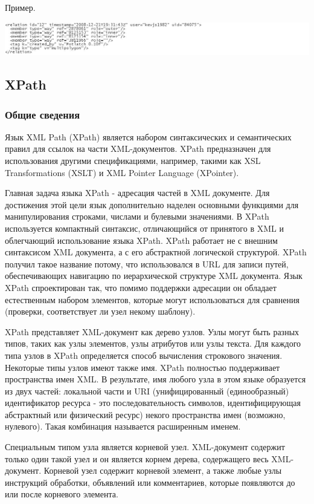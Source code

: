 \documentclass[12pt,a4paper,oneside]{article} %
\begin{document}
Пример.

\includegraphics[width=1.2\linewidth]{ref}

\newpage
\subsection{XPath}
\subsubsection{Общие сведения}
Язык XML Path (XPath) является набором синтаксических и семантических правил для ссылок на части XML-документов. XPath предназначен для использования другими спецификациями, например, такими как XSL Transformations (XSLT) и XML Pointer Language (XPointer).

Главная задача языка XPath - адресация частей в XML документе. Для достижения этой цели язык дополнительно наделен основными функциями для манипулирования строками, числами и булевыми значениями. В XPath используется компактный синтаксис, отличающийся от принятого в XML и облегчающий использование языка XPath. XPath работает не с внешним синтаксисом XML документа, а с его абстрактной логической структурой. XPath получил такое название потому, что использовался в URL для записи путей, обеспечивающих навигацию по иерархической структуре XML документа.
Язык XPath спроектирован так, что помимо поддержки адресации он обладает естественным набором элементов, которые могут использоваться для сравнения (проверки, соответствует ли узел некому шаблону).

XPath представляет XML-документ как дерево узлов. Узлы могут быть разных типов, таких как узлы элементов, узлы атрибутов или узлы текста. Для каждого типа узлов в XPath определяется способ вычисления строкового значения. Некоторые типы узлов имеют также имя. XPath полностью поддерживает пространства имен XML. В результате, имя любого узла в этом языке образуется из двух частей: локальной части и URI (унифицированный (единообразный) идентификатор ресурса - это последовательность символов, идентифицирующая абстрактный или физический ресурс) некого пространства имен (возможно, нулевого). Такая комбинация называется расширенным именем.

Специальным типом узла является корневой узел. XML-документ содержит только один такой узел и он является корнем дерева, содержащего весь XML-документ. Корневой узел содержит корневой элемент, а также любые узлы инструкций обработки, объявлений или комментариев, которые появляются до или после корневого элемента.
\end{document}
